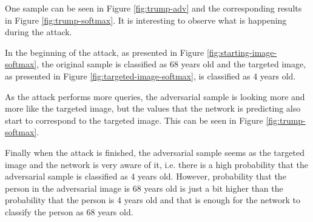 One sample can be seen in Figure \ref{fig:trump-adv} and the corresponding results in Figure \ref{fig:trump-softmax}. It is interesting to observe what is happening during the attack. 

In the beginning of the attack, as presented in Figure \ref{fig:starting-image-softmax}, the original sample is classified as 68 years old and the targeted image, as presented in Figure \ref{fig:targeted-image-softmax}, is classified as 4 years old. 

As the attack performs more queries, the adversarial sample is looking more and more like the targeted image, but the values that the network is predicting also start to correspond to the targeted image. This can be seen in Figure \ref{fig:trump-softmax}.

Finally when the attack is finished, the adversarial sample seems as the targeted image and the network is very aware of it, i.e. there is a high probability that the adversarial sample is classified as 4 years old. However, probability that the person in the adversarial image is 68 years old is just a bit higher than the probability that the person is 4 years old and that is enough for the network to classify the person as 68 years old. 

